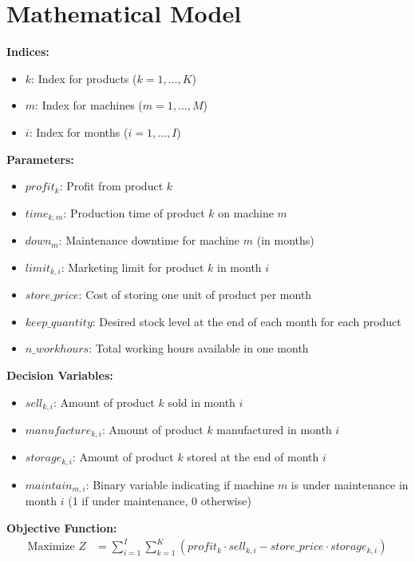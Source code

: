 \documentclass{article}
\begin{document}
\section*{Mathematical Model}

\textbf{Indices:}
\begin{itemize}
    \item $k$: Index for products ($k = 1, \ldots, K$)
    \item $m$: Index for machines ($m = 1, \ldots, M$)
    \item $i$: Index for months ($i = 1, \ldots, I$)
\end{itemize}

\textbf{Parameters:}
\begin{itemize}
    \item $profit_k$: Profit from product $k$
    \item $time_{k, m}$: Production time of product $k$ on machine $m$
    \item $down_m$: Maintenance downtime for machine $m$ (in months)
    \item $limit_{k, i}$: Marketing limit for product $k$ in month $i$
    \item $store\_price$: Cost of storing one unit of product per month
    \item $keep\_quantity$: Desired stock level at the end of each month for each product
    \item $n\_workhours$: Total working hours available in one month
\end{itemize}

\textbf{Decision Variables:}
\begin{itemize}
    \item $sell_{k, i}$: Amount of product $k$ sold in month $i$
    \item $manufacture_{k, i}$: Amount of product $k$ manufactured in month $i$
    \item $storage_{k, i}$: Amount of product $k$ stored at the end of month $i$
    \item $maintain_{m, i}$: Binary variable indicating if machine $m$ is under maintenance in month $i$ (1 if under maintenance, 0 otherwise)
\end{itemize}

\textbf{Objective Function:}
\begin{align*}
\text{Maximize } Z &= \sum_{i=1}^{I} \sum_{k=1}^{K} \left( profit_k \cdot sell_{k, i} - store\_price \cdot storage_{k, i} \right)
\end{align*}
\end{document}
